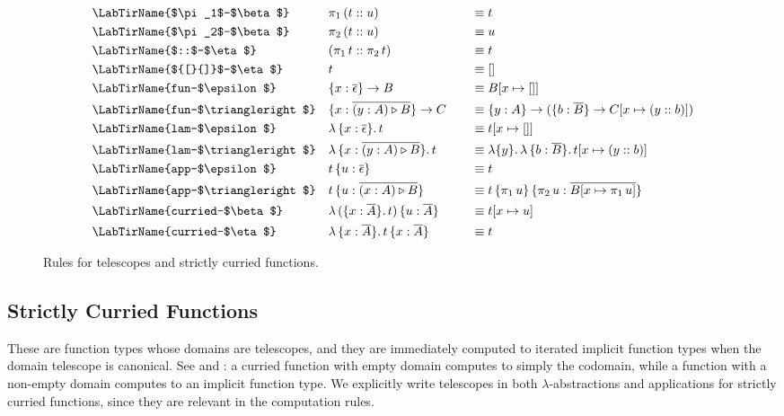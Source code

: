 \documentclass[acmsmall,review,anonymous,prologue,dvipsnames]{acmart}\settopmatter{printfolios=true,printccs=false,printacmref=false}
\newcommand{\TCons}{\triangleright}
\newcommand{\ol}[1]{\overline{#1}}
\theoremstyle{remark}
\begin{document}
\begin{figure}[h]
\begin{alignat*}{3}
  & \text{\LabTirName{$\pi_1$-$\beta$}}\hspace{2em}  && \pi_1\,(t :: u) && \equiv t\\
  & \text{\LabTirName{$\pi_2$-$\beta$}}  && \pi_2\,(t :: u) && \equiv u\\
  & \text{\LabTirName{$::$-$\eta$}}  && (\pi_1\,t :: \pi_2\,t) && \equiv t\\
  & \text{\LabTirName{${[}{]}$-$\eta$}}  && t && \equiv []\\
  & \text{\LabTirName{fun-$\epsilon$}}\hspace{3em} && \{x : \ol{\epsilon}\}\to B && \equiv B[x \mapsto []]\\
  & \text{\LabTirName{fun-$\TCons$}}         && \{x : \ol{(y : A) \TCons B}\}\to C \quad && \equiv
                                               \{y : A\}\to(\{b : \ol{B}\}\to C[x \mapsto (y :: b)])\\
  & \text{\LabTirName{lam-$\epsilon$}}       && \lambda\,\{x : \ol{\epsilon}\}.\,t && \equiv t[x \mapsto []]\\
  & \text{\LabTirName{lam-$\TCons$}}         && \lambda\,\{x : \ol{(y : A)\TCons B}\}.\,t && \equiv
                                         \lambda\{y\}.\,\lambda\,\{b : \ol{B}\}.\,t[x \mapsto (y :: b)]\\
  & \text{\LabTirName{app-$\epsilon$}}       && t\,\{u : \ol{\epsilon}\} && \equiv t\\
  & \text{\LabTirName{app-$\TCons$}}         && t\,\{u : \ol{(x : A) \TCons B}\} &&\equiv
                                         t\,\{\pi_1\,u\}\,\{\pi_2\,u : \ol{B[x \mapsto \pi_1\,u]}\}\\
  & \text{\LabTirName{curried-$\beta$}} && \lambda\,(\{x : \ol{A}\}.\,t)\,\{u:\ol{A}\} &&\equiv
                                                             t[x \mapsto u]\\
  & \text{\LabTirName{curried-$\eta$}}  && \lambda\,\{x : \ol{A}\}.\,t\,\{x : \ol{A}\} && \equiv t
\end{alignat*}

\caption{Rules for telescopes and strictly curried functions.}
\label{fig:telescopes}
\end{figure}


\subsection{Strictly Curried Functions}

These are function types whose domains are telescopes, and they are immediately
computed to iterated implicit function types when the domain telescope is
canonical.  See  and \LabTirName{fun-$\TCons$}: a
curried function with empty domain computes to simply the codomain, while a
function with a non-empty domain computes to an implicit function type. We
explicitly write telescopes in both $\lambda$-abstractions and applications for
strictly curried functions, since they are relevant in the computation rules.
\end{document}
